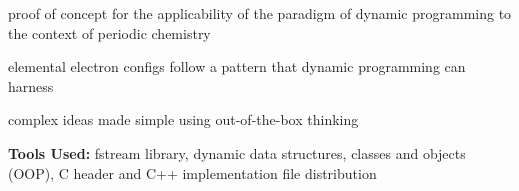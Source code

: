 \begin{tightemize}
\item proof of concept for the applicability of the paradigm of dynamic programming to the context of periodic chemistry 
\item elemental electron configs follow a pattern that dynamic programming can harness
\item complex ideas made simple using out-of-the-box thinking 
\item \textbf{Tools Used:} fstream library, dynamic data structures, classes and objects (OOP), C header and C++ implementation file distribution
\end{tightemize}
\sectionsep

